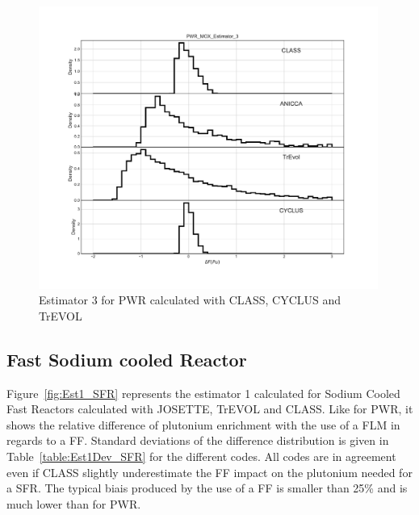\begin{figure}[h]
	\begin{center}
		\includegraphics[width = 0.99\textwidth]{../../Feature_1/RAW_DATA/FIG/PWR_MOX_Estimator_3.pdf}
		\caption{Estimator 3 for PWR calculated with CLASS, CYCLUS and TrEVOL}
		\label{fig:Est3_PWR}
	\end{center}
\end{figure}



\subsection{Fast Sodium cooled Reactor}

Figure~\ref{fig:Est1_SFR} represents the estimator 1 calculated for Sodium Cooled Fast Reactors calculated with JOSETTE, TrEVOL and CLASS. Like for PWR, it shows the relative difference of plutonium enrichment with the use of a FLM in regards to a FF. Standard deviations of the difference distribution is given in Table~\ref{table:Est1Dev_SFR} for the different codes. 
All codes are in agreement even if CLASS slightly underestimate the FF impact on the plutonium needed for a SFR. The typical biais produced by the use of a FF is smaller than 25\% and is much lower than for PWR.  

